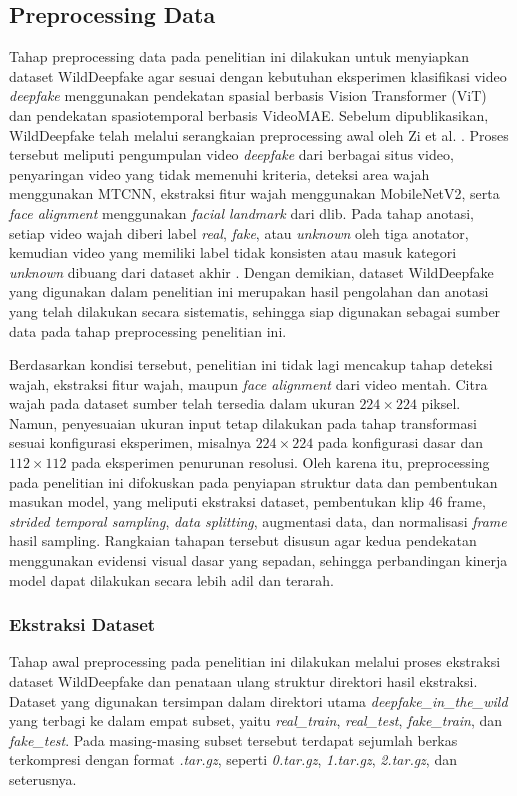 \subsection{Preprocessing Data} \label{III.Preprocessing Data}
Tahap preprocessing data pada penelitian ini dilakukan untuk menyiapkan dataset WildDeepfake agar sesuai dengan kebutuhan eksperimen klasifikasi video \textit{deepfake} menggunakan pendekatan spasial berbasis Vision Transformer (ViT) dan pendekatan spasiotemporal berbasis VideoMAE. Sebelum dipublikasikan, WildDeepfake telah melalui serangkaian preprocessing awal oleh Zi et al. \cite{Zi2024}. Proses tersebut meliputi pengumpulan video \textit{deepfake} dari berbagai situs video, penyaringan video yang tidak memenuhi kriteria, deteksi area wajah menggunakan MTCNN, ekstraksi fitur wajah menggunakan MobileNetV2, serta \textit{face alignment} menggunakan \textit{facial landmark} dari dlib. Pada tahap anotasi, setiap video wajah diberi label \textit{real}, \textit{fake}, atau \textit{unknown} oleh tiga anotator, kemudian video yang memiliki label tidak konsisten atau masuk kategori \textit{unknown} dibuang dari dataset akhir \cite{Zi2024}. Dengan demikian, dataset WildDeepfake yang digunakan dalam penelitian ini merupakan hasil pengolahan dan anotasi yang telah dilakukan secara sistematis, sehingga siap digunakan sebagai sumber data pada tahap preprocessing penelitian ini. \par

Berdasarkan kondisi tersebut, penelitian ini tidak lagi mencakup tahap deteksi wajah, ekstraksi fitur wajah, maupun \textit{face alignment} dari video mentah. Citra wajah pada dataset sumber telah tersedia dalam ukuran $224 \times 224$ piksel. Namun, penyesuaian ukuran input tetap dilakukan pada tahap transformasi sesuai konfigurasi eksperimen, misalnya $224 \times 224$ pada konfigurasi dasar dan $112 \times 112$ pada eksperimen penurunan resolusi. Oleh karena itu, preprocessing pada penelitian ini difokuskan pada penyiapan struktur data dan pembentukan masukan model, yang meliputi ekstraksi dataset, pembentukan klip 46 frame, \textit{strided temporal sampling}, \textit{data splitting}, augmentasi data, dan normalisasi \textit{frame} hasil sampling. Rangkaian tahapan tersebut disusun agar kedua pendekatan menggunakan evidensi visual dasar yang sepadan, sehingga perbandingan kinerja model dapat dilakukan secara lebih adil dan terarah. \par

\subsubsection{Ekstraksi Dataset}
Tahap awal preprocessing pada penelitian ini dilakukan melalui proses ekstraksi dataset WildDeepfake dan penataan ulang struktur direktori hasil ekstraksi. Dataset yang digunakan tersimpan dalam direktori utama \textit{deepfake\_in\_the\_wild} yang terbagi ke dalam empat subset, yaitu \textit{real\_train}, \textit{real\_test}, \textit{fake\_train}, dan \textit{fake\_test}. Pada masing-masing subset tersebut terdapat sejumlah berkas terkompresi dengan format \textit{.tar.gz}, seperti \textit{0.tar.gz}, \textit{1.tar.gz}, \textit{2.tar.gz}, dan seterusnya. \par

